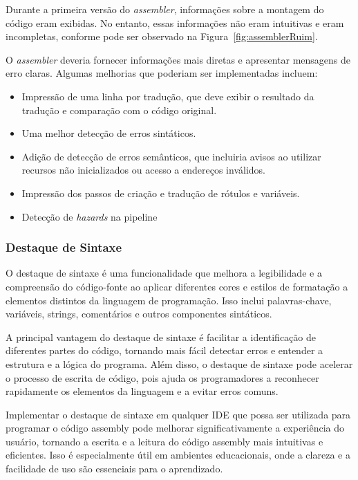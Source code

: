 \documentclass[
	12pt,				%
	openright,			%
	oneside,			%
	a4paper,			%
	english,			%
	french,				%
	spanish,			%
	brazil,				%
	]{abntex2}
\begin{document}
Durante a primeira versão do \textit{assembler}, informações sobre a montagem do código eram exibidas. No entanto, essas informações não eram intuitivas e eram incompletas, conforme pode ser observado na Figura~\ref{fig:assemblerRuim}.

O \textit{assembler} deveria fornecer informações mais diretas e apresentar mensagens de erro claras. Algumas melhorias que poderiam ser implementadas incluem:
\begin{itemize}
  \item Impressão de uma linha por tradução, que deve exibir o resultado da tradução e comparação com o código original.
  \item Uma melhor detecção de erros sintáticos.
  \item Adição de detecção de erros semânticos, que incluiria avisos ao utilizar recursos não inicializados ou acesso a endereços inválidos.
  \item Impressão dos passos de criação e tradução de rótulos e variáveis.
  \item Detecção de \textit{hazards} na pipeline
\end{itemize}

\subsubsection{Destaque de Sintaxe}\label{recursos_syntax}
O destaque de sintaxe é uma funcionalidade que melhora a legibilidade e a compreensão do código-fonte ao aplicar diferentes cores e estilos de formatação a elementos distintos da linguagem de programação. Isso inclui palavras-chave, variáveis, strings, comentários e outros componentes sintáticos.

A principal vantagem do destaque de sintaxe é facilitar a identificação de diferentes partes do código, tornando mais fácil detectar erros e entender a estrutura e a lógica do programa. Além disso, o destaque de sintaxe pode acelerar o processo de escrita de código, pois ajuda os programadores a reconhecer rapidamente os elementos da linguagem e a evitar erros comuns.

Implementar o destaque de sintaxe em qualquer IDE que possa ser utilizada para programar o código assembly pode melhorar significativamente a experiência do usuário, tornando a escrita e a leitura do código assembly mais intuitivas e eficientes. Isso é especialmente útil em ambientes educacionais, onde a clareza e a facilidade de uso são essenciais para o aprendizado.
\end{document}

